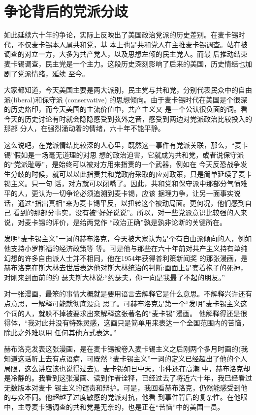\documentclass[10pt]{article}
\begin{document}
{\pagebreak
\section{争论背后的党派分歧}

如此延续六十年的争论，实际上反映出了美国政治党派的历史差别。在麦卡锡时代，不仅麦卡锡本人属共和党，基
本上也是共和党人在主推麦卡锡调查。站在被调查的对立一方，大多为共产党人，以及思想左倾的民主党人。而最
后推动结束麦卡锡调查，民主党是一个主力。这段历史深刻影响了后来的美国，历史情结也加剧了党派情绪，延续
至今。

大家都知道，今天美国主要是两大派别，民主党与共和党，分别代表民众中的自由派(liberal)和保守派
(conservative) 的思想倾向。由于麦卡锡时代在美国是个很深的历史烙印，而今天美国的主流价值中，共产主义又
是一个公认很负面的词。看今天的历史讨论有时就会隐隐感受到弦外之音，感受到两边对党派政治比较投入的那部
分人，在强烈涌动着的情绪，六十年不能平静。

这么说吧，在党派情结比较深的人心里，既然这一事件有党派关联，那么，``麦卡锡''假如是一场毫无道理的对思
想的政治迫害，它就成为共和党，或者说保守派的``党派耻辱''，是始终可以被对方用来指责的一个武器，例如在
今天反恐战争发生分歧的时候，就可以以此指责共和党政府采取的应对政策，只是简单延续了麦卡锡主义。只一句
话，对方就可以闭嘴了。因此，共和党和保守派中那部分气愤难平的人，更认为一切争论必须追溯到麦卡锡，应该
据理力争，让另一面事实说话，通过``指出真相''来为麦卡锡平反，以扭转这个被动局面。更何况，他们感到自己
看到的那部分事实，没有被``好好说说''。所以，对一些党派意识比较强的人来说，对麦卡锡的评价，是给两党作
``政治正确''孰是孰非论断的关键所在。

发明``麦卡锡主义''一词的赫布洛克，今天被大家认为是个有自由派倾向的人，例如他支持小罗斯福的经济政策等
等。可是他与那些在六十年前对共产主义持有单纯幻想的许多自由派人士并不相同，他在1954年获得普利策新闻奖
的那张漫画，是赫布洛克在斯大林去世后表达他对斯大林统治的判断:画面上是套着袍子的死神，对刚来到面前的约
瑟夫\textperiodcentered 斯大林说:``约瑟夫，你一向是我最了不起的朋友。''

对一张漫画，最笨的事情大概就是要用语言去解释它是什么意思。不解释兴许还有点意思，一解释可能就彻底没意
思了。可赫布洛克是第一个``发明''麦卡锡主义这个词的人，就躲不掉被要求出来解释这张著名的``麦卡锡''漫画。
他解释得还是很得体，``我对此并没有特殊灵感，这画只是简单用来表达一个全国范围内的苦恼，除此之外难以用
任何其他方式表达。''

赫布洛克发表这张漫画，是在麦卡锡被卷入麦卡锡主义之后刚两个多月时画的(我知道这话听上去有点语病，可既然
``麦卡锡主义''一词的定义已经超出了他的个人局限，这么讲应该也说得过去)。麦卡锡如日中天，事件还在高潮
中，赫布洛克却是冷静的。我看到这张漫画、读到作者诠释，已经过去了将近六十年，我已经看过无数版本对麦卡
锡主义的谴责和辩护。可是，我回看赫布洛克，仍然能感受到他的与众不同。他超越了过度敏感的党派对抗，他看
到事件背后的复杂性。在他眼中，主导麦卡锡调查的共和党是无奈的，也是正在``苦恼''中的美国一员。

}
\end{document}
